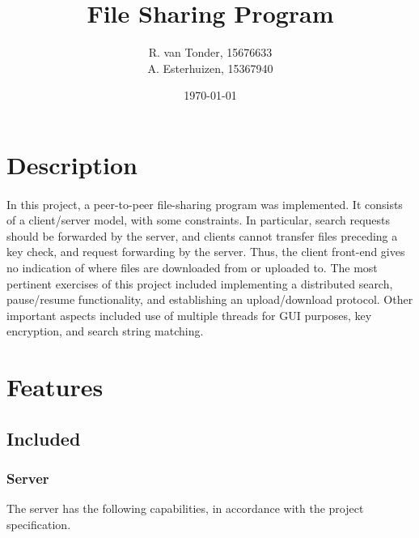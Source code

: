 \documentclass[10pt,a4paper]{article}
\title{File Sharing Program}
\author{R. van Tonder, 15676633 \\ A. Esterhuizen, 15367940}
\date{\today}
\begin{document}
\maketitle
\newpage
\tableofcontents
\newpage

\section{Description}
\paragraph{} 
In this project, a peer-to-peer file-sharing program was implemented. It consists of a client/server model, with some constraints. In particular, search requests should be forwarded by the server, and clients cannot transfer files preceding a key check, and request forwarding by the server. Thus, the client front-end gives no indication of where files are downloaded from or uploaded to. The most pertinent exercises of this project included implementing a distributed search, pause/resume functionality, and establishing an upload/download protocol. Other important aspects included use of multiple threads for GUI purposes, key encryption, and search string matching.

\section{Features}
\subsection{Included}
\subsubsection{Server}
The server has the following capabilities, in accordance with the
project specification.
\end{document}
